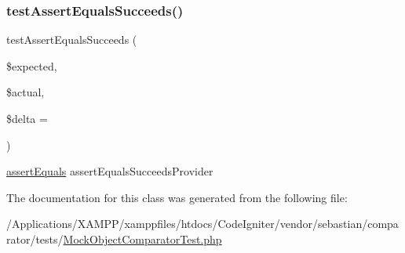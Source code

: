 \subsubsection{\texorpdfstring{test\+Assert\+Equals\+Succeeds()}{testAssertEqualsSucceeds()}}
{\footnotesize\ttfamily test\+Assert\+Equals\+Succeeds (\begin{DoxyParamCaption}\item[{}]{\$expected,  }\item[{}]{\$actual,  }\item[{}]{\$delta = {} }\end{DoxyParamCaption})}

\mbox{\hyperlink{_functions_8php_a441ec5f09711b6271edda774132eec5f}{assert\+Equals}}  assert\+Equals\+Succeeds\+Provider 

The documentation for this class was generated from the following file\+:\begin{DoxyCompactItemize}
\item 
/\+Applications/\+X\+A\+M\+P\+P/xamppfiles/htdocs/\+Code\+Igniter/vendor/sebastian/comparator/tests/\mbox{\hyperlink{_mock_object_comparator_test_8php}{Mock\+Object\+Comparator\+Test.\+php}}\end{DoxyCompactItemize}
